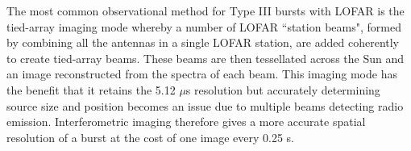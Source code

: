 





The most common observational method for Type III bursts with LOFAR is the tied-array imaging mode \citep{Morosan2014} whereby a number of LOFAR ``station beams", formed by combining all the antennas in a single LOFAR station, are added coherently to create tied-array beams. These beams are then tessellated across the Sun and an image reconstructed from the spectra of each beam. This imaging mode has the benefit that it retains the 5.12 $\mu$s resolution but accurately determining source size and position becomes an issue due to multiple beams detecting radio emission. Interferometric imaging therefore gives a more accurate spatial resolution of a burst at the cost of one image every 0.25 s.


